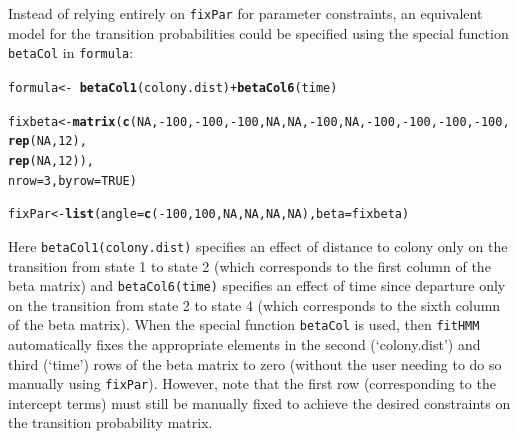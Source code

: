 \documentclass[12pt]{article}\usepackage[]{graphicx}\usepackage[]{color}
\makeatletter
\newcommand{\hlnum}[1]{\textcolor[rgb]{0.686,0.059,0.569}{#1}}%
\newcommand{\hlopt}[1]{\textcolor[rgb]{0,0,0}{#1}}%
\newcommand{\hlstd}[1]{\textcolor[rgb]{0.345,0.345,0.345}{#1}}%
\newcommand{\hlkwb}[1]{\textcolor[rgb]{0.69,0.353,0.396}{#1}}%
\newcommand{\hlkwc}[1]{\textcolor[rgb]{0.333,0.667,0.333}{#1}}%
\newcommand{\hlkwd}[1]{\textcolor[rgb]{0.737,0.353,0.396}{\textbf{#1}}}%
\newenvironment{kframe}{%
 \def\at@end@of@kframe{}%
 \ifinner\ifhmode%
  \def\at@end@of@kframe{\end{minipage}}%
  \begin{minipage}{\columnwidth}%
 \fi\fi%
 \def\FrameCommand##1{\hskip\@totalleftmargin \hskip-\fboxsep
 \colorbox{shadecolor}{##1}\hskip-\fboxsep
     \hskip-\linewidth \hskip-\@totalleftmargin \hskip\columnwidth}%
 \MakeFramed {\advance\hsize-\width
   \@totalleftmargin\z@ \linewidth\hsize
   \@setminipage}}%
 {\par\unskip\endMakeFramed%
 \at@end@of@kframe}
\newenvironment{knitrout}{}{} %
\makeatother
\begin{document}
Instead of relying entirely on \verb|fixPar| for parameter constraints, an equivalent model for the transition probabilities could be specified using the special function \verb|betaCol| in \verb|formula|:
\begin{knitrout}
\color{fgcolor}\begin{kframe}
\begin{alltt}
\hlstd{formula} \hlkwb{<-} \hlopt{~} \hlkwd{betaCol1}\hlstd{(colony.dist)} \hlopt{+} \hlkwd{betaCol6}\hlstd{(time)}

\hlstd{fixbeta} \hlkwb{<-} \hlkwd{matrix}\hlstd{(}\hlkwd{c}\hlstd{(}\hlnum{NA}\hlstd{,}\hlopt{-}\hlnum{100}\hlstd{,}\hlopt{-}\hlnum{100}\hlstd{,}\hlopt{-}\hlnum{100}\hlstd{,}\hlnum{NA}\hlstd{,}\hlnum{NA}\hlstd{,}\hlopt{-}\hlnum{100}\hlstd{,}\hlnum{NA}\hlstd{,}\hlopt{-}\hlnum{100}\hlstd{,}\hlopt{-}\hlnum{100}\hlstd{,}\hlopt{-}\hlnum{100}\hlstd{,}\hlopt{-}\hlnum{100}\hlstd{,}
                    \hlkwd{rep}\hlstd{(}\hlnum{NA}\hlstd{,}\hlnum{12}\hlstd{),}
                    \hlkwd{rep}\hlstd{(}\hlnum{NA}\hlstd{,}\hlnum{12}\hlstd{)),}
                  \hlkwc{nrow}\hlstd{=}\hlnum{3}\hlstd{,}\hlkwc{byrow}\hlstd{=}\hlnum{TRUE}\hlstd{)}

\hlstd{fixPar} \hlkwb{<-} \hlkwd{list}\hlstd{(}\hlkwc{angle}\hlstd{=}\hlkwd{c}\hlstd{(}\hlopt{-}\hlnum{100}\hlstd{,}\hlnum{100}\hlstd{,}\hlnum{NA}\hlstd{,}\hlnum{NA}\hlstd{,}\hlnum{NA}\hlstd{,}\hlnum{NA}\hlstd{),}\hlkwc{beta}\hlstd{=fixbeta)}
\end{alltt}
\end{kframe}
\end{knitrout}
Here \verb|betaCol1(colony.dist)| specifies an effect of distance to colony only on the transition from state 1 to state 2 (which corresponds to the first column of the beta matrix) and \verb|betaCol6(time)| specifies an effect of time since departure only on the transition from state 2 to state 4 (which corresponds to the sixth column of the beta matrix).  When the special function \verb|betaCol| is used, then \verb|fitHMM| automatically fixes the appropriate elements in the second (`colony.dist') and third (`time') rows of the beta matrix to zero (without the user needing to do so manually using \verb|fixPar|). However, note that the first row (corresponding to the intercept terms) must still be manually fixed to achieve the desired constraints on the transition probability matrix.
\end{document}
